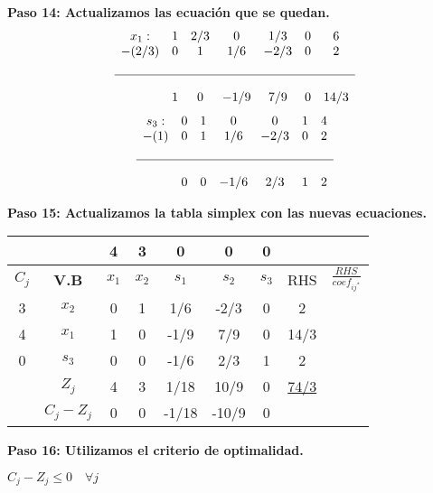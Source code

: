 \documentclass{templateNote}
\begin{document}
\textbf{Paso 14: Actualizamos las ecuación que se quedan.}
\begin{equation*}
    \begin{array}{ccccccc}
        x_1: & 1 & 2/3 & 0 & 1/3 & 0 & 6 \\
        -(2/3) & 0 & 1 & 1/6 & -2/3 & 0 & 2 \\
        \\ \hline \\
        & 1 & 0 & -1/9 & 7/9 & 0 & 14/3 
    \end{array}
\end{equation*}
\vspace{0.5cm}
\begin{equation*}
    \begin{array}{ccccccc}
        s_3: & 0 & 1 & 0 & 0 & 1 & 4 \\
        -(1) & 0 & 1 & 1/6 & -2/3 & 0 & 2 \\
        \\ \hline \\
        & 0 & 0 & -1/6 & 2/3 & 1 & 2
    \end{array}
\end{equation*}

\textbf{Paso 15: Actualizamos la tabla simplex con las nuevas ecuaciones.}
\begin{center}
    \begin{tabular}{|c|c|c|c|c|c|c|c|c|}
        \hline
        & & 4 & 3 & 0 & 0 & 0 &  &  \\ \hline
        $C_j$ & \textbf{V.B} & $x_1$ & $x_2$ & $s_1$ & $s_2$ & $s_3$ & RHS & $\displaystyle\frac{RHS}{coef_{ij^*}}$ \\ \hline
        3 & $x_2$ & 0 & 1 & 1/6 & -2/3 & 0 & 2 & \\ \hline
        4 & $x_1$ & 1 & 0 & -1/9 & 7/9 & 0 & 14/3 & \\ \hline
        0 & $s_3$ & 0 & 0 & -1/6 & 2/3 & 1 & 2 & \\ \hline
        & $Z_j$ & 4 & 3 & 1/18 & 10/9 & 0 & \underline{74/3} &  \\ \hline
        & $C_j - Z_j$ & 0 & 0 & -1/18 & -10/9 & 0 &  &  \\ \hline
    \end{tabular}
\end{center}

\newpage
\textbf{Paso 16: Utilizamos el criterio de optimalidad.}
\begin{center}
    $C_j - Z_j \leq 0 \quad \forall j$
\end{center}
\end{document}
